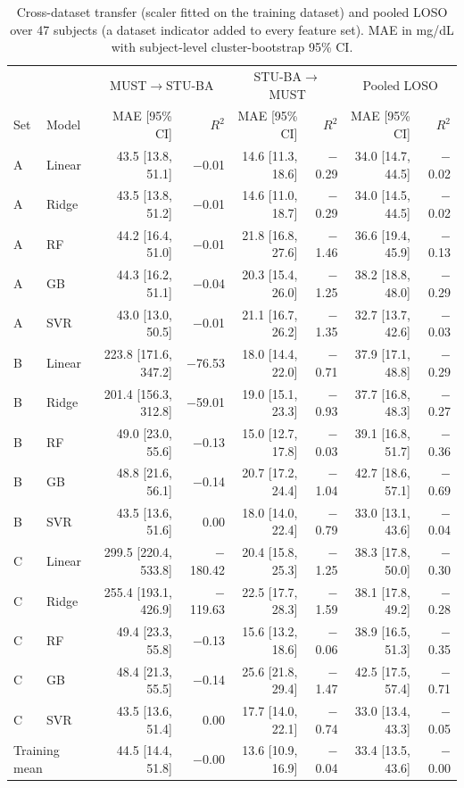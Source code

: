 \begin{table}[htbp]\centering\small
\caption{Cross-dataset transfer (scaler fitted on the training dataset) and pooled LOSO over 47 subjects (a dataset indicator added to every feature set). MAE in mg/dL with subject-level cluster-bootstrap 95\% CI.}\label{tab:s2}
\begin{tabular}{llrrrrrr}\hline
&&\multicolumn{2}{c}{MUST$\to$STU-BA}&\multicolumn{2}{c}{STU-BA$\to$MUST}&\multicolumn{2}{c}{Pooled LOSO}\\
Set&Model&MAE [95\% CI]&$R^2$&MAE [95\% CI]&$R^2$&MAE [95\% CI]&$R^2$\\\hline
A&Linear&43.5 [13.8, 51.1]&$-$0.01&14.6 [11.3, 18.6]&$-$0.29&34.0 [14.7, 44.5]&$-$0.02\\
A&Ridge&43.5 [13.8, 51.2]&$-$0.01&14.6 [11.0, 18.7]&$-$0.29&34.0 [14.5, 44.5]&$-$0.02\\
A&RF&44.2 [16.4, 51.0]&$-$0.01&21.8 [16.8, 27.6]&$-$1.46&36.6 [19.4, 45.9]&$-$0.13\\
A&GB&44.3 [16.2, 51.1]&$-$0.04&20.3 [15.4, 26.0]&$-$1.25&38.2 [18.8, 48.0]&$-$0.29\\
A&SVR&43.0 [13.0, 50.5]&$-$0.01&21.1 [16.7, 26.2]&$-$1.35&32.7 [13.7, 42.6]&$-$0.03\\
B&Linear&223.8 [171.6, 347.2]&$-$76.53&18.0 [14.4, 22.0]&$-$0.71&37.9 [17.1, 48.8]&$-$0.29\\
B&Ridge&201.4 [156.3, 312.8]&$-$59.01&19.0 [15.1, 23.3]&$-$0.93&37.7 [16.8, 48.3]&$-$0.27\\
B&RF&49.0 [23.0, 55.6]&$-$0.13&15.0 [12.7, 17.8]&$-$0.03&39.1 [16.8, 51.7]&$-$0.36\\
B&GB&48.8 [21.6, 56.1]&$-$0.14&20.7 [17.2, 24.4]&$-$1.04&42.7 [18.6, 57.1]&$-$0.69\\
B&SVR&43.5 [13.6, 51.6]&0.00&18.0 [14.0, 22.4]&$-$0.79&33.0 [13.1, 43.6]&$-$0.04\\
C&Linear&299.5 [220.4, 533.8]&$-$180.42&20.4 [15.8, 25.3]&$-$1.25&38.3 [17.8, 50.0]&$-$0.30\\
C&Ridge&255.4 [193.1, 426.9]&$-$119.63&22.5 [17.7, 28.3]&$-$1.59&38.1 [17.8, 49.2]&$-$0.28\\
C&RF&49.4 [23.3, 55.8]&$-$0.13&15.6 [13.2, 18.6]&$-$0.06&38.9 [16.5, 51.3]&$-$0.35\\
C&GB&48.4 [21.3, 55.5]&$-$0.14&25.6 [21.8, 29.4]&$-$1.47&42.5 [17.5, 57.4]&$-$0.71\\
C&SVR&43.5 [13.6, 51.4]&0.00&17.7 [14.0, 22.1]&$-$0.74&33.0 [13.4, 43.3]&$-$0.05\\
\hline\multicolumn{2}{l}{Training mean}&44.5 [14.4, 51.8]&$-$0.00&13.6 [10.9, 16.9]&$-$0.04&33.4 [13.5, 43.6]&$-$0.00\\\hline\end{tabular}\end{table}
